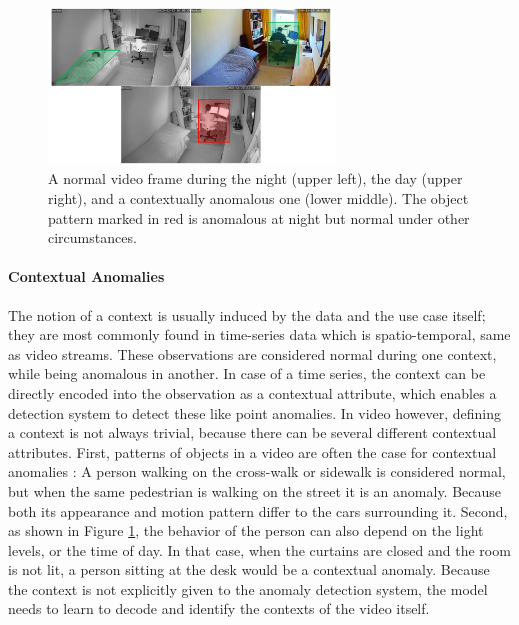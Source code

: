 \begin{figure}
	\centering
	\includegraphics[width=0.68\textwidth]{graphics/anomalyDetection/anomalies/contextualAnomaly/contextualAnomaly.pdf}
  \caption[Contextual anomaly in video.]{A normal video frame during the night (upper left), the day (upper right), and a contextually anomalous one (lower middle). The object pattern marked in red is anomalous at night but normal under other circumstances.}
  \label{fig:contextual_vid_anomaly}
\end{figure}

\paragraph{Contextual Anomalies} \label{par:context_ano}
The notion of a context is usually induced by the data and the use case itself; they are most commonly found in time-series data which is spatio-temporal, same as video streams. These observations are considered normal during one context, while being anomalous in another. In case of a time series, the context can be directly encoded into the observation as a contextual attribute, which enables a detection system to detect these like point anomalies. In video however, defining a context is not always trivial, because there can be several different contextual attributes. First, patterns of objects in a video are often the case for contextual anomalies \cite{shin20203d}: A person walking on the cross-walk or sidewalk is considered normal, but when the same pedestrian is walking on the street it is an anomaly. Because both its appearance and motion pattern differ to the cars surrounding it. Second, as shown in Figure \ref{fig:contextual_vid_anomaly}, the behavior of the person can also depend on the light levels, or the time of day. In that case, when the curtains are closed and the room is not lit, a person sitting at the desk would be a contextual anomaly. Because the context is not explicitly given to the anomaly detection system, the model needs to learn to decode and identify the contexts of the video itself.


